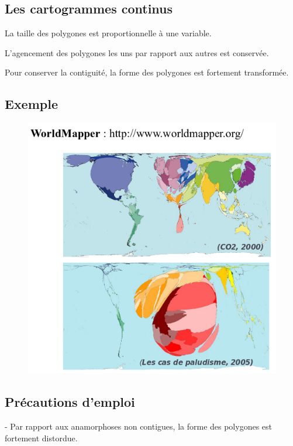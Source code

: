 \documentclass[]{book}
\begin{document}
\subsection{Les cartogrammes continus}\label{les-cartogrammes-continus}

La taille des polygones est proportionnelle à une variable.

L'agencement des polygones les uns par rapport aux autres est conservée.

Pour conserver la contiguité, la forme des polygones est fortement
transformée.

\subsection{Exemple}\label{exemple-2}

\begin{figure}
\centering
\includegraphics{img/c.png}
\caption{}
\end{figure}

\subsection{Précautions d'emploi}\label{precautions-demploi-2}

- Par rapport aux anamorphoses non contigues, la forme des polygones est
fortement distordue.
\end{document}

